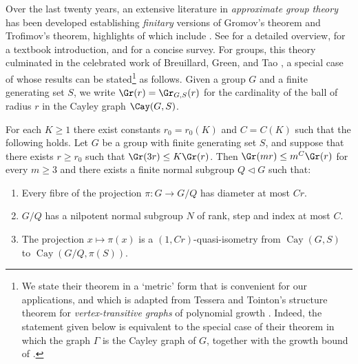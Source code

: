 Over the last twenty years, an extensive literature in \emph{approximate group theory} has been developed establishing \emph{finitary} versions of Gromov's theorem and Trofimov's theorem, highlights of which include \cite{bgt12,shalom-tao,MR2833482,tt.Trof,MR2827010}. See \cite{breuillard2014brief} for a detailed overview, \cite{MR3971253} for a textbook introduction, and \cite{tointon2020brief} for a concise survey.
For groups, this theory culminated in the celebrated work of Breuillard, Green, and Tao \cite{bgt12}, a special case of whose results can be stated\footnote{We state their theorem in a `metric' form that is convenient for our applications, and which is adapted from Tessera and Tointon's structure theorem for \emph{vertex-transitive graphs} of polynomial growth \cite[Theorem 2.3]{tt.Trof}. Indeed, the statement given below is equivalent to the special case of their theorem in which the graph $\Gamma$ is the Cayley graph of $G$, together with the growth bound of \cite[Corollary 11.9]{bgt12}. 
%
} as follows. Given a group $G$ and a finite generating set $S$, we write $\Gr(r)=\Gr_{G,S}(r)$ for the cardinality of the ball of radius $r$ in the Cayley graph $\Cay(G,S)$.

\begin{thm}
\label{thm:BGT_metric}
For each $K\geq 1$ there exist constants $r_0=r_0(K)$ and $C=C(K)$ such that the following holds. Let $G$ be a group with finite generating set $S$, and suppose that there exists $r \geq r_0$ such that $\Gr(3r) \leq K\Gr(r)$. Then $\Gr(mr) \leq m^C \Gr(r)$ for every $m\geq 3$ and there exists a finite normal subgroup $Q \triangleleft G$ such that:

\begin{enumerate}
    \item Every fibre of the projection $\pi:G \rightarrow G/Q$ has diameter at most $Cr$.
    
    
    \item $G/Q$ has a nilpotent normal subgroup $N$ of rank, step and index at most $C$.
    
    
    
    \item The projection $x\mapsto \pi(x)$ is a $(1,Cr)$-quasi-isometry from $\operatorname{Cay}(G,S)$ to $\operatorname{Cay}(G/Q,\pi(S))$.
\end{enumerate}
\end{thm}

